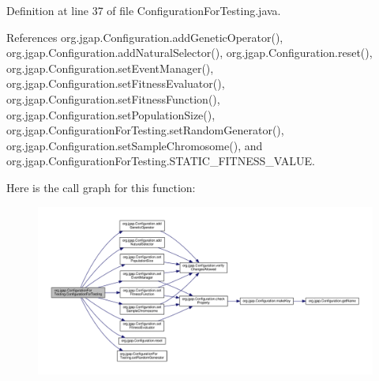 Definition at line 37 of file Configuration\-For\-Testing.\-java.



References org.\-jgap.\-Configuration.\-add\-Genetic\-Operator(), org.\-jgap.\-Configuration.\-add\-Natural\-Selector(), org.\-jgap.\-Configuration.\-reset(), org.\-jgap.\-Configuration.\-set\-Event\-Manager(), org.\-jgap.\-Configuration.\-set\-Fitness\-Evaluator(), org.\-jgap.\-Configuration.\-set\-Fitness\-Function(), org.\-jgap.\-Configuration.\-set\-Population\-Size(), org.\-jgap.\-Configuration\-For\-Testing.\-set\-Random\-Generator(), org.\-jgap.\-Configuration.\-set\-Sample\-Chromosome(), and org.\-jgap.\-Configuration\-For\-Testing.\-S\-T\-A\-T\-I\-C\-\_\-\-F\-I\-T\-N\-E\-S\-S\-\_\-\-V\-A\-L\-U\-E.



Here is the call graph for this function\-:
\nopagebreak
\begin{figure}[H]
\begin{center}
\leavevmode
\includegraphics[width=350pt]{classorg_1_1jgap_1_1_configuration_for_testing_a3961613b202a5c21e97e6b493c967a5c_cgraph}
\end{center}
\end{figure}




